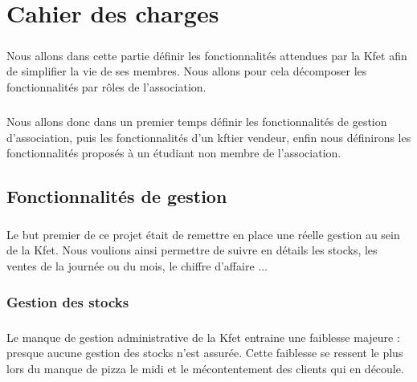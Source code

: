 \documentclass[twoside,UTF8]{EPURapport}
\begin{document}
\chapter{Cahier des charges}%

    \paragraph{}Nous allons dans cette partie définir les fonctionnalités attendues par la Kfet afin de simplifier la vie de ses membres. Nous allons pour cela décomposer les fonctionnalités par rôles de l'association. 
    \paragraph{}Nous allons donc dans un premier temps définir les fonctionnalités de gestion d'association, puis les fonctionnalités d'un kftier vendeur, enfin nous définirons les fonctionnalités proposés à un étudiant non membre de l'association.

    \section{Fonctionnalités de gestion}

        \paragraph{}Le but premier de ce projet était de remettre en place une réelle gestion au sein de la Kfet. Nous voulions ainsi permettre de suivre en détails les stocks, les ventes de la journée ou du mois, le chiffre d'affaire ...

        \subsection{Gestion des stocks}

            \paragraph{}Le manque de gestion administrative de la Kfet entraine une faiblesse majeure : presque aucune gestion des stocks n'est assurée. Cette faiblesse se ressent le plus lors du manque de pizza le midi et le mécontentement des clients qui en découle.
\end{document}
